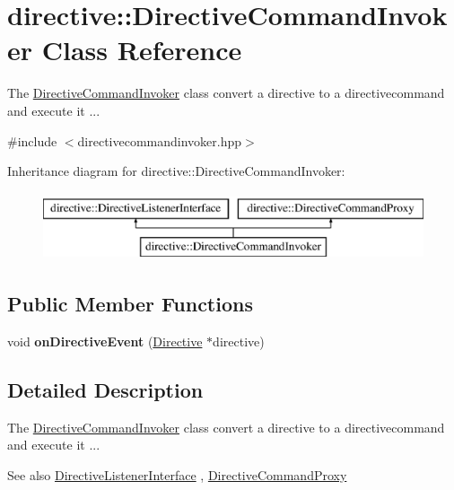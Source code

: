 \hypertarget{classdirective_1_1DirectiveCommandInvoker}{}\section{directive\+:\+:Directive\+Command\+Invoker Class Reference}
\label{classdirective_1_1DirectiveCommandInvoker}


The \hyperlink{classdirective_1_1DirectiveCommandInvoker}{Directive\+Command\+Invoker} class convert a directive to a directivecommand and execute it ...  




{\ttfamily \#include $<$directivecommandinvoker.\+hpp$>$}

Inheritance diagram for directive\+:\+:Directive\+Command\+Invoker\+:\begin{figure}[H]
\begin{center}
\leavevmode
\includegraphics[height=2.000000cm]{d4/d42/classdirective_1_1DirectiveCommandInvoker}
\end{center}
\end{figure}
\subsection*{Public Member Functions}
\begin{DoxyCompactItemize}
\item 
\mbox{\label{classdirective_1_1DirectiveCommandInvoker_aadaaf6eb94fb80b35ee550b20cd82935}} 
void {\bfseries on\+Directive\+Event} (\hyperlink{classdirective_1_1Directive}{Directive} $\ast$directive)
\end{DoxyCompactItemize}


\subsection{Detailed Description}
The \hyperlink{classdirective_1_1DirectiveCommandInvoker}{Directive\+Command\+Invoker} class convert a directive to a directivecommand and execute it ... 

\begin{DoxySeeAlso}{See also}
\hyperlink{classdirective_1_1DirectiveListenerInterface}{Directive\+Listener\+Interface} , \hyperlink{classdirective_1_1DirectiveCommandProxy}{Directive\+Command\+Proxy} 
\end{DoxySeeAlso}


